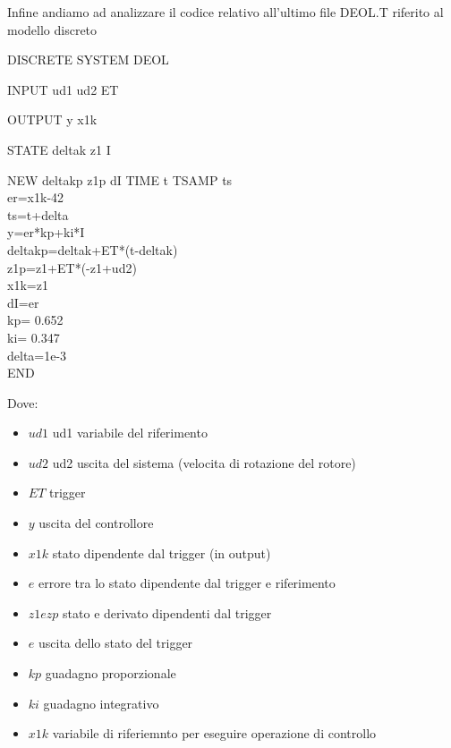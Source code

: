 \documentclass[a4paper,13pt]{article}
\begin{document}
Infine andiamo ad analizzare il codice relativo all'ultimo file DEOL.T riferito al modello discreto

DISCRETE SYSTEM DEOL

INPUT ud1 ud2 ET

OUTPUT y x1k

STATE deltak z1 I

NEW  deltakp z1p dI
TIME t
TSAMP ts\\
er=x1k-42\\
ts=t+delta\\
y=er*kp+ki*I\\
deltakp=deltak+ET*(t-deltak)\\
z1p=z1+ET*(-z1+ud2)\\
x1k=z1\\
dI=er\\
kp= 0.652 \\
ki= 0.347 \\
delta=1e-3\\

END

Dove:
\begin{itemize}
\item $ud1$     ud1 variabile del riferimento
\item $ud2$     ud2 uscita del sistema (velocita di rotazione del rotore)
\item $ET$      trigger 
\item $y$       uscita del controllore
\item $x1k$     stato dipendente dal trigger (in output)
\item $e$       errore tra lo stato dipendente dal trigger e riferimento
\item $z1 e zp$ stato e derivato dipendenti dal trigger
\item $e$       uscita dello stato del trigger
\item $kp$      guadagno proporzionale
\item $ki$      guadagno integrativo
\item $x1k$     variabile di riferiemnto per eseguire operazione di controllo 
\end{itemize}
\end{document}
